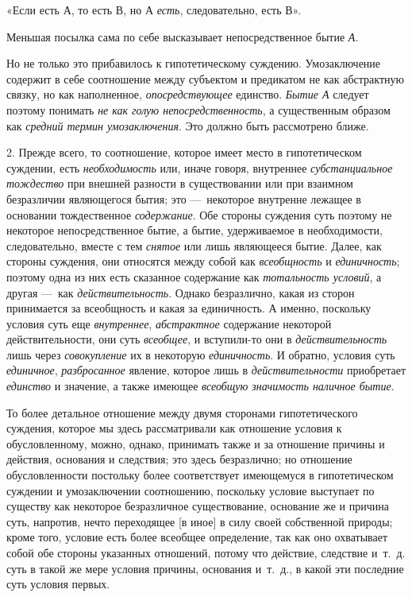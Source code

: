\documentclass[twoside]{article}
\begin{document}
{{{{{{«Если есть А, то есть В,
но А {\em есть},
следовательно, есть В».

Меньшая посылка сама по себе высказывает непосредственное
бытие {\em А}.

Но не только это прибавилось к гипотетическому суждению.
Умозаключение содержит в себе соотношение между субъектом и предикатом не
как абстрактную связку, но как наполненное,
{\em опосредствующее}
единство. {\em Бытие А}
следует поэтому понимать
{\em не как голую непосредственность},
а существенным образом как
{\em средний термин умозаключения}.
Это должно быть рассмотрено ближе.

2. Прежде всего, то соотношение, которое имеет место в
гипотетическом суждении, есть
{\em необходимость} или,
иначе говоря, внутреннее
{\em субстанциальное тождество}
при внешней разности в существовании или при
взаимном безразличии являющегося бытия; это —~некоторое
внутренне лежащее в основании тождественное
{\em содержание}. Обе
стороны суждения суть поэтому не некоторое непосредственное бытие, а бытие,
удерживаемое в необходимости, следовательно, вместе с тем
{\em снятое} или лишь
являющееся бытие. Далее, как стороны суждения, они относятся между собой
как {\em всеобщность} и
{\em единичность};
поэтому одна из них есть сказанное содержание как
{\em тотальность условий},
а другая —~как
{\em действительность}.
Однако безразлично, какая из сторон принимается за
всеобщность и какая за единичность. А именно, поскольку условия суть еще
{\em внутреннее},
{\em абстрактное}
содержание некоторой действительности, они суть
{\em всеобщее}, и
вступили-то они в
{\em действительность}
лишь через
{\em совокупление} их в
некоторую {\em единичность}.
И обратно, условия суть
{\em единичное},
{\em разбросанное}
явление, которое лишь в
{\em действительности}
приобретает
{\em единство} и
значение, а также имеющее {\em всеобщую
значимость наличное бытие}.

То более детальное отношение между двумя сторонами
гипотетического суждения, которое мы здесь рассматривали как отношение
условия к обусловленному, можно, однако, принимать также и за отношение
причины и действия, основания и следствия; это здесь безразлично; но
отношение обусловленности постольку более соответствует имеющемуся в
гипотетическом суждении и умозаключении соотношению, поскольку условие
выступает по существу как некоторое безразличное существование, основание
же и причина суть, напротив, нечто переходящее [в иное] в силу своей
собственной природы; кроме того, условие есть более всеобщее определение,
так как оно охватывает собой обе стороны указанных отношений, потому что
действие, следствие и~т.~д. суть в такой же мере условия причины, основания
и~т.~д., в какой эти последние суть условия первых.

}}}}}}
\end{document}
